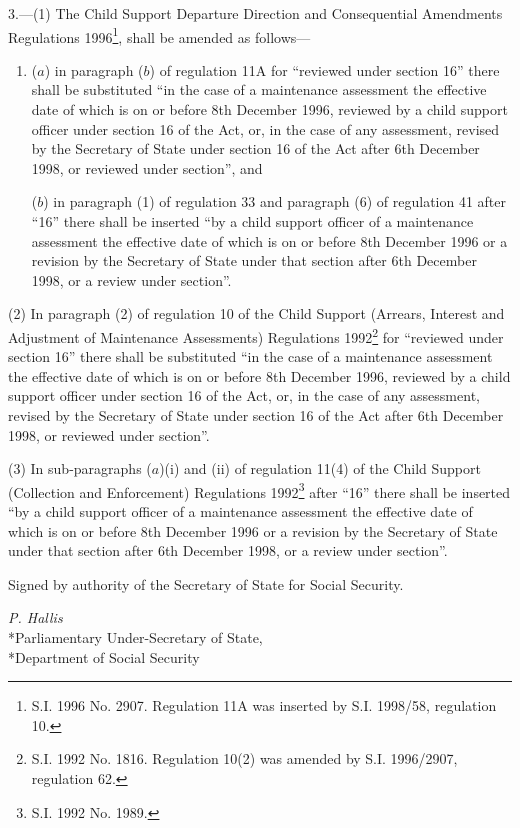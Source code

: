 \documentclass[12pt,a4paper]{article}
\begin{document}
3.—(1) The Child Support Departure Direction and Consequential Amendments Regulations 1996\footnote{\frenchspacing S.I. 1996 No. 2907. Regulation 11A was inserted by S.I. 1998/58, regulation 10.}, shall be amended as follows—
\begin{enumerate}\item[]
($a$) in paragraph ($b$) of regulation 11A for “reviewed under section 16” there shall be substituted “in the case of a maintenance assessment the effective date of which is on or before 8th December 1996, reviewed by a child support officer under section 16 of the Act, or, in the case of any assessment, revised by the Secretary of State under section 16 of the Act after 6th December 1998, or reviewed under section”, and

($b$) in paragraph (1) of regulation 33 and paragraph (6) of regulation 41 after “16” there shall be inserted “by a child support officer of a maintenance assessment the effective date of which is on or before 8th December 1996 or a revision by the Secretary of State under that section after 6th December 1998, or a review under section”.
\end{enumerate}

(2) In paragraph (2) of regulation 10 of the Child Support (Arrears, Interest and Adjustment of Maintenance Assessments) Regulations 1992\footnote{\frenchspacing S.I. 1992 No. 1816. Regulation 10(2) was amended by S.I. 1996/2907, regulation 62.} for “reviewed under section 16” there shall be substituted “in the case of a maintenance assessment the effective date of which is on or before 8th December 1996, reviewed by a child support officer under section 16 of the Act, or, in the case of any assessment, revised by the Secretary of State under section 16 of the Act after 6th December 1998, or reviewed under section”.

(3) In sub-paragraphs ($a$)(i) and (ii) of regulation 11(4) of the Child Support (Collection and Enforcement) Regulations 1992\footnote{\frenchspacing S.I. 1992 No. 1989.} after “16” there shall be inserted “by a child support officer of a maintenance assessment the effective date of which is on or before 8th December 1996 or a revision by the Secretary of State under that section after 6th December 1998, or a review under section”.

\bigskip

Signed 
by authority of the Secretary of State for Social Security.

{\raggedleft
\emph{P. Hallis}\\*Parliamentary Under-Secretary of State,\\*Department of Social Security

}
\end{document}
